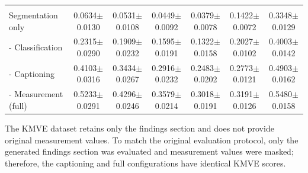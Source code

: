 \begin{table}[p]
\begin{threeparttable}
\begin{tabular}{lcccccc}
\midrule
\rowcolor{gray!20}
\multicolumn{7}{c}{\textbf{ZJH-TS Testset} ($n=150$)} \\
Segmentation only
& 0.0634$\pm$0.0130
& 0.0531$\pm$0.0108
& 0.0449$\pm$0.0092
& 0.0379$\pm$0.0078
& 0.1422$\pm$0.0072
& 0.3348$\pm$0.0129 \\
- Classification
& 0.2315$\pm$0.0290
& 0.1909$\pm$0.0232
& 0.1595$\pm$0.0191
& 0.1322$\pm$0.0158
& 0.2027$\pm$0.0102
& 0.4003$\pm$0.0142 \\
- Captioning
& 0.4103$\pm$0.0316
& 0.3434$\pm$0.0267
& 0.2916$\pm$0.0232
& 0.2483$\pm$0.0202
& 0.2773$\pm$0.0121
& 0.4903$\pm$0.0162 \\
- Measurement (full)
& 0.5233$\pm$0.0291
& 0.4296$\pm$0.0246
& 0.3579$\pm$0.0214
& 0.3018$\pm$0.0191
& 0.3191$\pm$0.0126
& 0.5480$\pm$0.0158 \\
\bottomrule
\end{tabular}

\begin{tablenotes}[flushleft]
\footnotesize
\item The KMVE dataset retains only the findings section and does not provide original measurement values. To match the original evaluation protocol, only the generated findings section was evaluated and measurement values were masked; therefore, the captioning and full configurations have identical KMVE scores.
\end{tablenotes}

\end{threeparttable}
\end{table}
